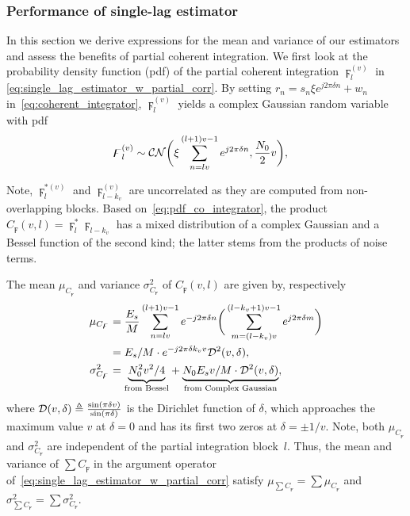 \subsubsection{Performance of single-lag estimator}

In this section we derive expressions for the mean and variance of our
estimators and assess the benefits of partial coherent integration.
We first look at
the probability density function (pdf) of the partial coherent integration
$\digamma_l^{(v)}$ in
\eqref{eq:single_lag_estimator_w_partial_corr}.
By setting $r_n=s_n\xi e^{j2\pi \delta n}+w_n$ in~\eqref{eq:coherent_integrator},
$\digamma_{l}^{(v)}$ yields a complex Gaussian random variable with pdf
\begin{equation}
  \label{eq:pdf_co_integrator}
  \begin{aligned}
    &\digamma_l^{(v)} \sim \mathcal{CN}\bigg(\xi\sum_{n=lv}^{(l+1)v-1}e^{j2\pi \delta n},\frac{N_0}{2}v\bigg),
  \end{aligned}
\end{equation}

Note, $\digamma_l^{*(v)}$ and $\digamma_{l-k_v}^{(v)}$ are
uncorrelated as they are computed from non-overlapping blocks. 
Based on~\eqref{eq:pdf_co_integrator}, 
the product $C_{\digamma}(v,l)=\digamma_l^*\digamma_{l-k_v}$
has a mixed distribution of a complex Gaussian and a Bessel function
of the second kind; 
the latter stems from the products of noise terms. 

The mean $\mu_{C_{\digamma}}$ and variance $\sigma^2_{C_{\digamma}}$ of $C_{\digamma}(v,l)$ are given by, respectively 
\begin{equation}
  \begin{aligned}
  \label{eq:mean_var_product_coherent_int}
  \mu_{C_{\digamma}}&=\frac{E_s}{M}\sum_{n=lv}^{(l+1)v-1}e^{-j2\pi \delta n}\bigg(\sum_{m=(l-k_v)v}^{(l-k_v+1)v-1}e^{j2\pi \delta m}\bigg) \\
  &=E_s/M\cdot e^{-j2\pi \delta k_vv}\mathcal{D}^2(v,\delta), \\
  \sigma^2_{C_{\digamma}}&={\underbrace{N_0^2v^2/4}_{\text{from Bessel}}}+{\underbrace{N_0E_sv/M\cdot\mathcal{D}^2(v,\delta)}_{\text{from Complex Gaussian}}},
  \end{aligned}
\end{equation}
where $\mathcal{D}(v,\delta) \triangleq \frac{\sin(\pi \delta v)}{\sin(\pi
  \delta)}$ is the Dirichlet function of $\delta$, which approaches 
the maximum value $v$ at $\delta=0$ and has its first two zeros at $\delta=\pm 1/v$.
Note, both $\mu_{C_{\digamma}}$ and $\sigma^2_{C_{\digamma}}$ are independent of the partial integration block~$l$.
Thus, the mean and variance of  
$\sum C_{\digamma}$ in the argument operator of~\eqref{eq:single_lag_estimator_w_partial_corr} 
satisfy $\mu_{\sum C_{\digamma}}=\sum\mu_{C_{\digamma}}$ and 
$\sigma^2_{\sum C_{\digamma}}=\sum\sigma^2_{C_{\digamma}}$.

